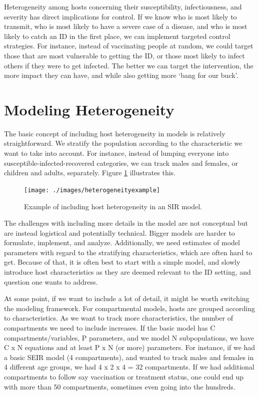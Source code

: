 \documentclass[
]{book}
\begin{document}
Heterogeneity among hosts concerning their susceptibility, infectiousness, and severity has direct implications for control. If we know who is most likely to transmit, who is most likely to have a severe case of a disease, and who is most likely to catch an ID in the first place, we can implement targeted control strategies. For instance, instead of vaccinating people at random, we could target those that are most vulnerable to getting the ID, or those most likely to infect others if they were to get infected. The better we can target the intervention, the more impact they can have, and while also getting more `bang for our buck'.

\hypertarget{modeling-heterogeneity}{%
\section{Modeling Heterogeneity}\label{modeling-heterogeneity}}

The basic concept of including host heterogeneity in models is relatively straightforward. We stratify the population according to the characteristic we want to take into account. For instance, instead of lumping everyone into susceptible-infected-recovered categories, we can track males and females, or children and adults, separately. Figure \ref{fig:heterogeneity} illustrates this.

\begin{figure}
\texttt{[image: ./images/heterogeneityexample]} \caption{Example of including host heterogeneity in an SIR model.}\label{fig:heterogeneity}
\end{figure}

The challenges with including more details in the model are not conceptual but are instead logistical and potentially technical. Bigger models are harder to formulate, implement, and analyze. Additionally, we need estimates of model parameters with regard to the stratifying characteristics, which are often hard to get. Because of that, it is often best to start with a simple model, and slowly introduce host characteristics as they are deemed relevant to the ID setting, and question one wants to address.

At some point, if we want to include a lot of detail, it might be worth switching the modeling framework. For compartmental models, hosts are grouped according to characteristics. As we want to track more characteristics, the number of compartments we need to include increases. If the basic model has C compartments/variables, P parameters, and we model N subpopulations, we have C x N equations and at least P x N (or more) parameters. For instance, if we had a basic SEIR model (4 compartments), and wanted to track males and females in 4 different age groups, we had 4 x 2 x 4 = 32 compartments. If we had additional compartments to follow say vaccination or treatment status, one could end up with more than 50 compartments, sometimes even going into the hundreds.
\end{document}
